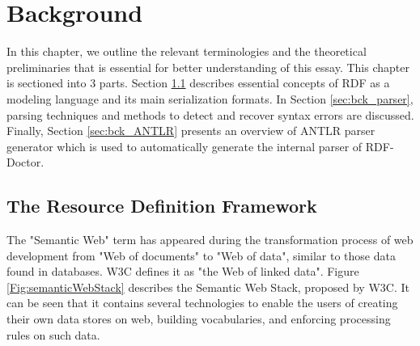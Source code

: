 \chapter{Background}
\label{ch:preliminaries}

In this chapter, we outline the relevant terminologies and the theoretical  preliminaries that is essential for better understanding of this essay.
This chapter is sectioned into 3 parts.
Section \ref{sec:bck_rdf_model} describes essential concepts of RDF as a modeling language and its main serialization formats. 
In Section \ref{sec:bck_parser}, parsing techniques and methods to detect and recover syntax errors are discussed. Finally, Section \ref{sec:bck_ANTLR} presents an overview of ANTLR parser generator which is used to automatically generate the internal parser of RDF-Doctor.


\section{The Resource Definition Framework}
\label{sec:bck_rdf_model}

The "Semantic Web" \cite{W3C:SemanticWebTerm:Online} term  has appeared during the transformation process of web development from "Web of documents" to "Web of data", similar to those data found in databases. 
W3C defines it as "the Web of linked data". {Figure \ref{Fig:semanticWebStack}} describes the Semantic Web Stack, proposed by W3C. 
It can be seen that it contains several technologies to enable the users of creating their own data stores on web, building vocabularies, and enforcing processing rules on such data.   

